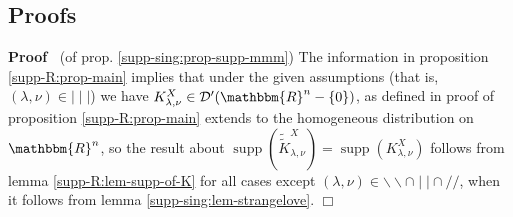\documentclass{article}
\newcommand{\tmop}[1]{\ensuremath{\operatorname{#1}}}
\renewenvironment{proof}{\noindent\textbf{Proof\ }}{\hspace*{\fill}$\Box$\medskip}
\theoremstyle{remark}
\begin{document}
\subsection{Proofs}

\begin{proof}
  (of prop. \ref{supp-sing:prop-supp-mmm}) The information in proposition
  \ref{supp-R:prop-main} implies that under the given assumptions (that is,
  $(\lambda, \nu) \in \mid \mid \mid$) we have $K_{\lambda, \nu}^X \in
  \mathcal{D}' (\mathbbm{R}^n - \{ 0 \})$, as defined in proof of proposition
  \ref{supp-R:prop-main} extends to the homogeneous distribution on
  $\mathbbm{R}^n$, so the result about $\tmop{supp}
  (\widetilde{\tilde{K}}_{\lambda, \nu}^X) = \tmop{supp} (K_{\lambda, \nu}^X)$
  follows from lemma \ref{supp-R:lem-supp-of-K} for all cases except
  $(\lambda, \nu) \in \backslash\backslash \cap \mid \mid \cap / /$, when it
  follows from lemma \ref{supp-sing:lem-strangelove}.
\end{proof}
\end{document}
